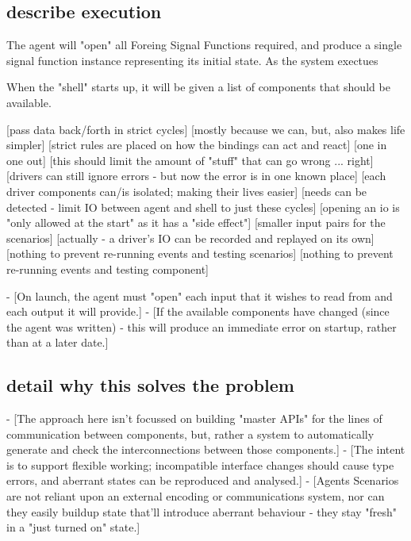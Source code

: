 \subsection{describe execution}




The agent will "open" all Foreing Signal Functions required, and produce a single signal function instance representing its initial state.
As the system exectues



When the "shell" starts up, it will be given a list of components that should be available.


[pass data back/forth in strict cycles]
    [mostly because we can, but, also makes life simpler]
    [strict rules are placed on how the bindings can act and react]
        [one in one out]
    [this should limit the amount of "stuff" that can go wrong ... right]
        [drivers can still ignore errors - but now the error is in one known place]
    [each driver components can/is isolated; making their lives easier]
[needs can be detected - limit IO between agent and shell to just these cycles]
    [opening an io is "only allowed at the start" as it has a "side effect"]
    [smaller input pairs for the scenarios]
        [actually - a driver's IO can be recorded and replayed on its own]
    [nothing to prevent re-running events and testing scenarios]
    [nothing to prevent re-running events and testing component]

    - [On launch, the agent must "open" each input that it wishes to read from and each output it will provide.]
        - [If the available components have changed (since the agent was written) - this will produce an immediate error on startup, rather than at a later date.]



\subsection{detail why this solves the problem}

- [The approach here isn't focussed on building "master APIs" for the lines of communication between components, but, rather a system to automatically generate and check the interconnections between those components.]
    - [The intent is to support flexible working; incompatible interface changes should cause type errors, and aberrant states can be reproduced and analysed.]
- [Agents Scenarios are not reliant upon an external encoding or communications system, nor can they easily buildup state that'll introduce aberrant behaviour - they stay "fresh" in a "just turned on" state.]

